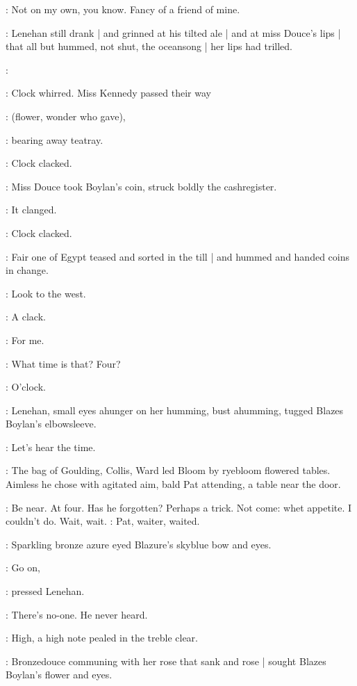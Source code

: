 \boylan:
Not on my own, you know.
Fancy of a friend of mine.

:
Lenehan still drank |
and grinned at his tilted ale |
and at miss Douce's lips |
that all but hummed,
not shut,
the oceansong |
her lips had trilled.

\MissD:

:
Clock whirred.
Miss Kennedy passed their way

\BloomInt:
(flower, wonder who gave),

:
bearing away teatray.

:
Clock clacked.

:
Miss Douce took Boylan's coin,
struck boldly the cashregister.

:
It clanged.

:
Clock clacked.

:
Fair one of Egypt teased and sorted in the till |
and hummed and handed coins in change.

\BloomInt:
Look to the west.

:
A clack.

\BloomInt:
For me.

\boylan:
What time is that?
Four?

:
O'clock.

:
Lenehan, small eyes ahunger on her humming,
bust ahumming,
tugged Blazes Boylan's elbowsleeve.

\lenehan:
Let's hear the time.


:
The bag of Goulding, Collis, Ward
led Bloom by ryebloom flowered tables.
Aimless he chose with agitated aim,
bald Pat attending,
a table near the door.

\BloomInt:
Be near.
At four.
Has he forgotten?
Perhaps a trick.
Not come: whet appetite.
I couldn't do.
Wait, wait.
:
Pat, waiter, waited.

:
Sparkling bronze azure eyed Blazure's skyblue bow and eyes.

\lenehan:
Go on,

:
pressed Lenehan.

\lenehan:
There's no-one.
He never heard.


:
High, a high note pealed in the treble clear.

:
Bronzedouce communing with her rose that sank and rose |
sought Blazes Boylan's flower and eyes.

